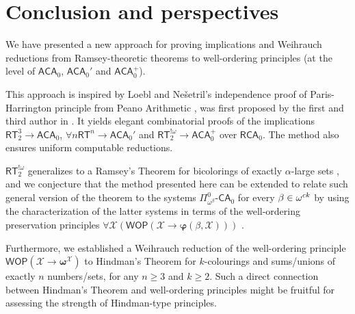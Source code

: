 \documentclass{amsart}
\newcommand\RCA{\mathsf{RCA}}
\newcommand\ACA{\mathsf{ACA}}
\newcommand\RT{\mathsf{RT}}
\newcommand\CA{\mathsf{CA}}
\newcommand\WOP{\mathsf{WOP}}
\newcommand{\LoX}{\mathcal{X}}
\newcommand\boldomega{\pmb{\omega}}
\begin{document}
\section{Conclusion and perspectives}
We have presented a new approach for proving implications and Weihrauch reductions
from Ramsey-theoretic theorems to well-ordering principles (at the level of 
$\ACA_0$, $\ACA_0'$ and $\ACA_0^+$). 

This approach is inspired by Loebl and Ne\v{s}etril's independence proof of Paris-Harrington principle from Peano Arithmetic \cite{Loe-Nes:92}, was first proposed by the first and third author in \cite{Car-Zda:RT}. It yields elegant combinatorial proofs of the implications $\RT^3_2\to \ACA_0$, $\forall n \RT^n \to \ACA_0'$ and $\RT^{!\omega}_2 \to \ACA_0^+$ over
$\RCA_0$. The method also ensures uniform computable reductions. 

$\RT^{!\omega}_2$ generalizes to a Ramsey's Theorem for bicolorings of exactly $\alpha$-large sets \cite{Far-Neg:08}, and we conjecture that the method presented here can be extended to relate such general version of the theorem to the systems $\Pi_{\omega^\beta}^0$-$\CA_0$ for every $\beta \in \omega^{\textsc{ck}}$ by using
the characterization of the latter systems in terms of the well-ordering preservation 
principles $\forall \LoX (\WOP(\LoX \to \pmb{\varphi}(\beta,\LoX)))$ \cite{Mar-Mon:11}. 

Furthermore, we established a Weihrauch reduction of the well-ordering principle
$\WOP(\LoX\to\boldomega^\LoX)$ to Hindman's Theorem for $k$-colourings and sums/unions of exactly $n$ numbers/sets, for any $n \geq 3$ and $k \geq 2$. Such a direct
connection between Hindman's Theorem and well-ordering principles might be fruitful for assessing
the strength of Hindman-type principles.
\end{document}
